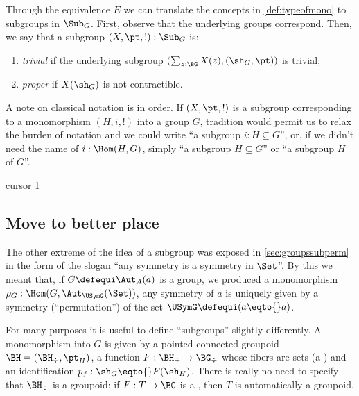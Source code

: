 Through the equivalence $E$ we can translate the concepts in
\cref{def:typeofmono} to subgroups in $\Sub_G$. 
First, observe that the underlying groups correspond. 
Then, we say that a subgroup $(X,\pt,!):\Sub_G$ is:
      \begin{enumerate}
      \item \emph{trivial} if the underlying subgroup
      $(\sum_{z:\BG}X(z),(\sh_G,\pt))$ is trivial;
      \item \emph{proper} if $X(\sh_G)$ is not
      contractible.
      \end{enumerate}

      \begin{remark}
      \label{rem:notationsubgroup}
      A note on classical notation is in order.
If $(X,\pt,!)$ is a subgroup corresponding to a monomorphism $(H,i,!)$ into a group $G$, tradition would permit us to relax the burden of notation and we could write ``a subgroup $i:H\subseteq G$'', or, if we didn't need the name of $i:\Hom(H,G)$, simply ``a subgroup $H\subseteq G$'' or ``a subgroup $H$ of $G$''.
    \end{remark}
    

    {\large cursor 1}
    
    \subsection{Move to better place}
    


The other extreme of the idea of a subgroup was exposed in \cref{sec:groupssubperm} in the form of the slogan ``any symmetry is a symmetry in $\Set$''.
By this we meant that, if $G \defequi \Aut_A(a)$ is a group, we produced a monomorphism $\rho_G:\Hom(G,\Aut_{\USymG}(\Set))$,
\ie any symmetry of $a$ is uniquely given by a symmetry (``permutation'') of the set $\USymG\defequi (a\eqto{}a)$.

For many purposes it is useful to define ``subgroups'' slightly differently.
A monomorphism into $G$ is given by a pointed connected groupoid  $\BH=(\BH_\div,\pt_H)$, a function $F:\BH_\div\to\BG_\div$ whose fibers are sets (a \covering) and an identification $p_f:\sh_G\eqto{}F(\sh_H)$.  There is really no need to specify that $\BH_\div$ is a groupoid: if $F:T\to \BG$ is a \covering, then $T$ is automatically a groupoid.

